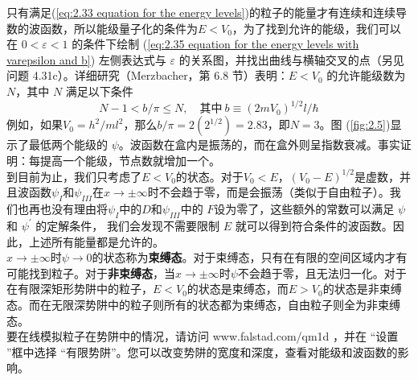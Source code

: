 	只有满足(\ref{eq:2.33 equation for the energy levels})的粒子的能量才有连续和连续导数的波函数，所以能级量子化的条件为$E<V_0$，为了找到允许的能级，我们可以在 $0<\varepsilon<1$ 的条件下绘制 (\ref{eq:2.35 equation for the energy levels with varepsilon and b}) 左侧表达式与 $\varepsilon$ 的关系图，并找出曲线与横轴交叉的点（另见问题 4.31c）。详细研究（Merzbacher，第 6.8 节）表明：$E<V_0$ 的允许能级数为 $N$，其中 $N$ 满足以下条件
	\begin{equation}
		N-1 < b/\pi \le N, \quad \text{其中}\: b \equiv \left(2mV_0\right)^{1/2}l /\hbar
		\label{eq:2.36 requirement for allowed energy levels' number N}
	\end{equation}
	例如，如果$V_0 = h^2/ml^2$，那么$b/\pi = 2\left(2^{1/2}\right) = 2.83$，即$N=3$。图 (\ref{fig:2.5})显示了最低两个能级的 $\psi$。波函数在盒内是振荡的，而在盒外则呈指数衰减。事实证明：每提高一个能级，节点数就增加一个。\\
	\indent 到目前为止，我们只考虑了$E<V_0$的状态。对于$V_0<E$，$\left(V_0-E\right)^{1/2}$是虚数，并且波函数$\psi_I$和$\psi_{III}$在$x \to \pm \infty$时不会趋于零，而是会振荡（类似于自由粒子）。我们也再也没有理由将$\psi_I$中的$D$和$\psi_{III}$中的 $F$设为零了，这些额外的常数可以满足 $\psi$ 和 $\psi^{\prime}$ 的定解条件，
	我们会发现不需要限制 $E$ 就可以得到符合条件的波函数。因此，上述所有能量都是允许的。\\
	\indent $x \to \pm \infty$时$\psi \to 0$的状态称为\textbf{束缚态}。对于束缚态，只有在有限的空间区域内才有可能找到粒子。对于\textbf{非束缚态}，当$x \to \pm \infty$时$\psi$不会趋于零，且无法归一化。对于在有限深矩形势阱中的粒子，$E<V_0$的状态是束缚态，而$E>V_0$的状态是非束缚态。而在无限深势阱中的粒子则所有的状态都为束缚态，自由粒子则全为非束缚态。\\
	\indent 要在线模拟粒子在势阱中的情况，请访问 www.falstad.com/qm1d ，并在 “设置 ”框中选择 “有限势阱”。您可以改变势阱的宽度和深度，查看对能级和波函数的影响。
	
